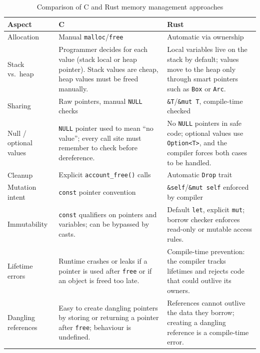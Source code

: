\begin{table}[htbp]
\centering
\begin{tabular}{|l|p{5.5cm}|p{5.5cm}|}
\hline
\textbf{Aspect} & \textbf{C} & \textbf{Rust} \\
\hline
Allocation & Manual \texttt{malloc}/\texttt{free} &
Automatic via ownership \\
\hline
Stack vs.\ heap & Programmer decides for each value
(stack local or heap pointer). Stack values are cheap,
heap values must be freed manually. &
Local variables live on the stack by default; values move
to the heap only through smart pointers such as \texttt{Box}
or \texttt{Arc}. \\
\hline
Sharing & Raw pointers, manual \texttt{NULL} checks &
\texttt{\&T}/\texttt{\&mut T}, compile-time checked \\
\hline
Null / optional values & \texttt{NULL} pointer used to mean
``no value''; every call site must remember to check before
dereference. &
No \texttt{NULL} pointers in safe code; optional values use
\texttt{Option<T>}, and the compiler forces both cases to be
handled. \\
\hline
Cleanup & Explicit \texttt{account\_free()} calls &
Automatic \texttt{Drop} trait \\
\hline
Mutation intent & \texttt{const} pointer convention &
\texttt{\&self}/\texttt{\&mut self} enforced by compiler \\
\hline
Immutability & \texttt{const} qualifiers on pointers and
variables; can be bypassed by casts. &
Default \texttt{let}, explicit \texttt{mut}; borrow checker
enforces read-only or mutable access rules. \\
\hline
Lifetime errors & Runtime crashes or leaks if a pointer is
used after \texttt{free} or if an object is freed too late. &
Compile-time prevention: the compiler tracks lifetimes and
rejects code that could outlive its owners. \\
\hline
Dangling references & Easy to create dangling pointers by
storing or returning a pointer after \texttt{free}; behaviour
is undefined. &
References cannot outlive the data they borrow; creating a
dangling reference is a compile-time error. \\
\hline
\end{tabular}
\caption{Comparison of C and Rust memory management approaches}
\label{tab:memory_comparison}
\end{table}
